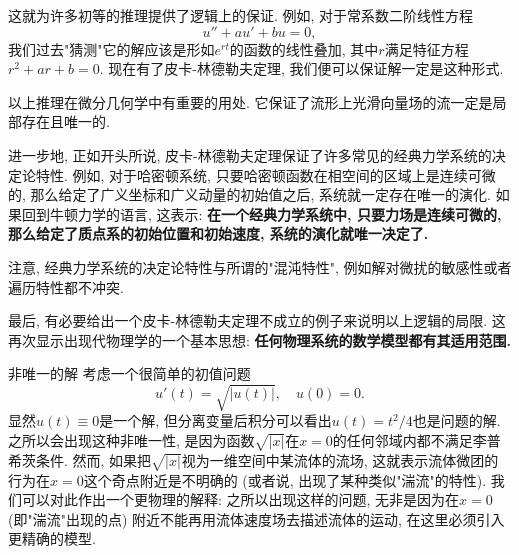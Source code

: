 这就为许多初等的推理提供了逻辑上的保证. 例如, 对于常系数二阶线性方程
$$
u''+au'+bu=0,
$$
我们过去"猜测"它的解应该是形如$e^{rt}$的函数的线性叠加, 其中$r$满足特征方程$r^2+ar+b=0$. 现在有了皮卡-林德勒夫定理, 我们便可以保证解一定是这种形式. 

以上推理在微分几何学中有重要的用处. 它保证了流形上光滑向量场的流一定是局部存在且唯一的.

进一步地, 正如开头所说, 皮卡-林德勒夫定理保证了许多常见的经典力学系统的决定论特性. 例如, 对于哈密顿系统, 只要哈密顿函数在相空间的区域上是连续可微的, 那么给定了广义坐标和广义动量的初始值之后, 系统就一定存在唯一的演化. 如果回到牛顿力学的语言, 这表示: \textbf{在一个经典力学系统中, 只要力场是连续可微的, 那么给定了质点系的初始位置和初始速度, 系统的演化就唯一决定了.}

注意, 经典力学系统的决定论特性与所谓的"混沌特性", 例如解对微扰的敏感性或者遍历特性都不冲突.

最后, 有必要给出一个皮卡-林德勒夫定理不成立的例子来说明以上逻辑的局限. 这再次显示出现代物理学的一个基本思想: \textbf{任何物理系统的数学模型都有其适用范围.}
\begin{example}{非唯一的解}
考虑一个很简单的初值问题
$$
u'(t)=\sqrt{|u(t)|},\quad u(0)=0.
$$
显然$u(t)\equiv0$是一个解, 但分离变量后积分可以看出$u(t)=t^2/4$也是问题的解. 之所以会出现这种非唯一性, 是因为函数$\sqrt{|x|}$在$x=0$的任何邻域内都不满足李普希茨条件. 然而, 如果把$\sqrt{|x|}$视为一维空间中某流体的流场, 这就表示流体微团的行为在$x=0$这个奇点附近是不明确的 (或者说, 出现了某种类似"湍流"的特性). 我们可以对此作出一个更物理的解释: 之所以出现这样的问题, 无非是因为在$x=0$ (即"湍流"出现的点) 附近不能再用流体速度场去描述流体的运动, 在这里必须引入更精确的模型.
\end{example}